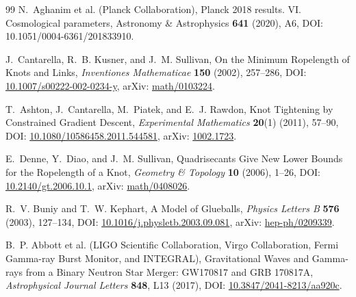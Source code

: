 \documentclass[11pt]{article}
\theoremstyle{definition}
\theoremstyle{plain}
\theoremstyle{remark}
\begin{document}
\begin{thebibliography}{99}
            N.~Aghanim et al. (Planck Collaboration),
            \newblock Planck 2018 results. VI. Cosmological parameters,
            \newblock Astronomy \& Astrophysics \textbf{641} (2020), A6,
            \newblock DOI: 10.1051/0004-6361/201833910.

            J.~Cantarella, R.~B. Kusner, and J.~M. Sullivan,
            \newblock On the Minimum Ropelength of Knots and Links,
            \newblock \emph{Inventiones Mathematicae} \textbf{150} (2002), 257--286,
            \newblock DOI: \href{https://doi.org/10.1007/s00222-002-0234-y}{10.1007/s00222-002-0234-y},
            \newblock arXiv: \href{https://arxiv.org/abs/math/0103224}{math/0103224}.

            T.~Ashton, J.~Cantarella, M.~Piatek, and E.~J. Rawdon,
            \newblock Knot Tightening by Constrained Gradient Descent,
            \newblock \emph{Experimental Mathematics} \textbf{20}(1) (2011), 57--90,
            \newblock DOI: \href{https://doi.org/10.1080/10586458.2011.544581}{10.1080/10586458.2011.544581},
            \newblock arXiv: \href{https://arxiv.org/abs/1002.1723}{1002.1723}.

            E.~Denne, Y.~Diao, and J.~M. Sullivan,
            \newblock Quadrisecants Give New Lower Bounds for the Ropelength of a Knot,
            \newblock \emph{Geometry \& Topology} \textbf{10} (2006), 1--26,
            \newblock DOI: \href{https://doi.org/10.2140/gt.2006.10.1}{10.2140/gt.2006.10.1},
            \newblock arXiv: \href{https://arxiv.org/abs/math/0408026}{math/0408026}.

            R.~V. Buniy and T.~W. Kephart,
            \newblock A Model of Glueballs,
            \newblock \emph{Physics Letters B} \textbf{576} (2003), 127--134,
            \newblock DOI: \href{https://doi.org/10.1016/j.physletb.2003.09.081}{10.1016/j.physletb.2003.09.081},
            \newblock arXiv: \href{https://arxiv.org/abs/hep-ph/0209339}{hep-ph/0209339}.

            B.~P. Abbott et al. (LIGO Scientific Collaboration, Virgo Collaboration, Fermi Gamma-ray Burst Monitor, and INTEGRAL),
            \newblock Gravitational Waves and Gamma-rays from a Binary Neutron Star Merger: GW170817 and GRB 170817A,
            \newblock \emph{Astrophysical Journal Letters} \textbf{848}, L13 (2017),
            \newblock DOI: \href{https://doi.org/10.3847/2041-8213/aa920c}{10.3847/2041-8213/aa920c}.


\end{thebibliography}
\end{document}
